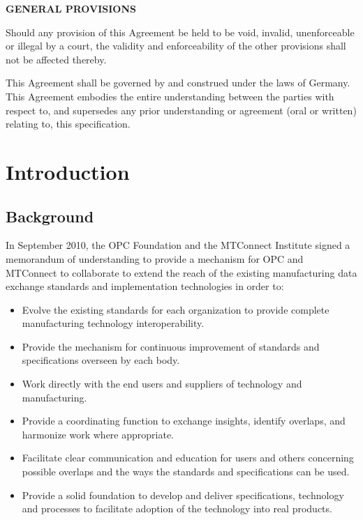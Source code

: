\documentclass{mtconnect}	%
\begin{document}
\textbf{GENERAL PROVISIONS}

Should any provision of this Agreement be held to be void, invalid, unenforceable or illegal by a court, the validity and enforceability of the other provisions shall not be affected thereby. 

This Agreement shall be governed by and construed under the laws of Germany.
This Agreement embodies the entire understanding between the parties with respect to, and supersedes any prior understanding or agreement (oral or written) relating to, this specification.


\clearpage
\tableofcontents
\thispagestyle{fancy}
\clearpage
\listoffigures
\thispagestyle{fancy}
\clearpage
{}


\section{Introduction}\label{intro}

\subsection{Background}

In September 2010, the OPC Foundation and the MTConnect Institute signed a memorandum of understanding to provide a mechanism for OPC and MTConnect to collaborate to extend the reach of the existing manufacturing data exchange standards and implementation technologies in order to:

\begin{itemize}
    \item Evolve the existing standards for each organization to provide complete manufacturing technology interoperability.
    \item Provide the mechanism for continuous improvement of standards and specifications overseen by each body.
    \item Work directly with the end users and suppliers of technology and manufacturing. 
    \item Provide a coordinating function to exchange insights, identify overlaps, and harmonize work where appropriate.
    \item Facilitate clear communication and education for users and others concerning possible overlaps and the ways the standards and specifications can be used.
    \item Provide a solid foundation to develop and deliver specifications, technology and processes to facilitate adoption of the technology into real products.
\end{itemize}
\end{document}
